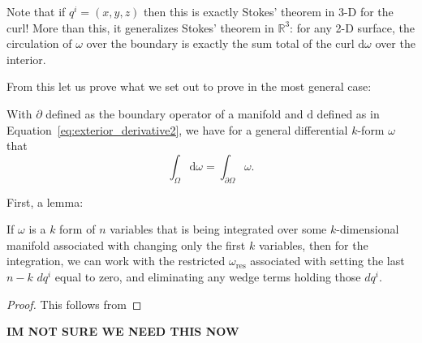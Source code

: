 	
	Note that if $q^i = (x,y,z)$ then this is exactly Stokes' theorem in 3-D for the curl! More than this, it generalizes Stokes' theorem in $\mathbb{R}^3$: for any 2-D surface, the circulation of $\omega$ over the boundary is exactly the sum total of the curl $\mathrm d \omega$ over the interior.
	
	From this let us prove what we set out to prove in the most general case:
	{
	\renewcommand{\thetheorem}{\ref{thm:GeneralStokes}}
	\begin{theorem}
		With $\partial$ defined as the boundary operator of a manifold and $\mathrm d$ defined as in Equation~\eqref{eq:exterior_derivative2}, we have for a general differential $k$-form $\omega$ that
		\begin{equation*} 
			\int_\Omega \mathrm d \omega = \int_{\partial \Omega} \omega.
		\end{equation*}
	\end{theorem}
	\addtocounter{theorem}{-1}
	}
	First, a lemma:
	
	\begin{lemma}
		If $\omega$ is a $k$ form of $n$ variables that is being integrated over some $k$-dimensional manifold associated with changing only the first $k$ variables, then for the integration, we can work with the restricted $\omega_{\text{res}}$ associated with setting the last $n-k$ $dq^i$ equal to zero, and eliminating any wedge terms holding those $dq^i$.
	\end{lemma}
	\begin{proof}
		This follows from
	\end{proof}
	\textbf{IM NOT SURE WE NEED THIS NOW}
	
